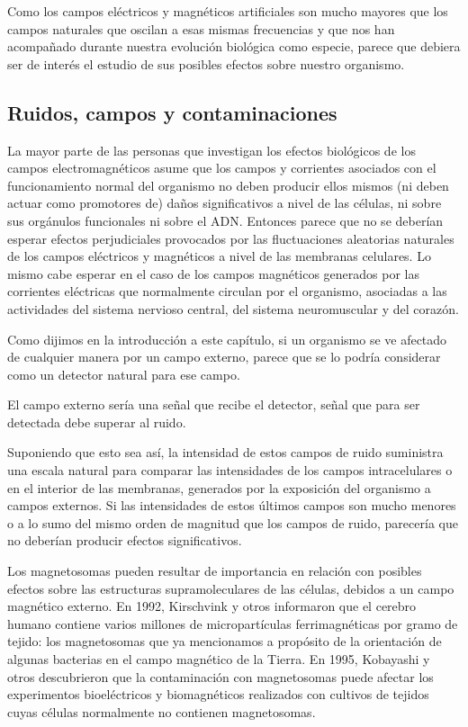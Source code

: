 Como los campos eléctricos y magnéticos artificiales son mucho mayores que los campos naturales que oscilan a esas mismas frecuencias y que nos han acompañado durante nuestra evolución biológica como especie, parece que debiera ser de interés el estudio de sus posibles efectos sobre nuestro organismo.

\subsection{Ruidos, campos y contaminaciones}

La mayor parte de las personas que investigan los efectos biológicos de los campos electromagnéticos asume que los campos y corrientes asociados con el funcionamiento normal del organismo no deben producir ellos mismos (ni deben actuar como promotores de) daños significativos a nivel de las células, ni sobre sus orgánulos funcionales ni sobre el ADN.
Entonces parece que no se deberían esperar efectos perjudiciales provocados por las fluctuaciones aleatorias naturales de los campos eléctricos y magnéticos a nivel de las membranas celulares.
Lo mismo cabe esperar en el caso de los campos magnéticos generados por las corrientes eléctricas que normalmente circulan por el organismo, asociadas a las actividades del sistema nervioso central, del sistema neuromuscular y del corazón.

Como dijimos en la introducción a este capítulo, si un organismo se ve afectado de cualquier manera por un campo externo, parece que se lo podría considerar como un detector natural para ese campo.

El campo externo sería una señal que recibe el detector, señal que para ser detectada debe superar al ruido.

Suponiendo que esto sea así, la intensidad de estos campos de ruido suministra una escala natural para comparar las intensidades de los campos intracelulares o en el interior de las membranas, generados por la exposición del organismo a campos externos.
Si las intensidades de estos últimos campos son mucho menores o a lo sumo del mismo orden de magnitud que los campos de ruido, parecería que no deberían producir efectos significativos.

Los magnetosomas pueden resultar de importancia en relación con posibles efectos sobre las estructuras supramoleculares de las células, debidos a un campo magnético externo.
En 1992, Kirschvink y otros informaron que el cerebro humano contiene varios millones de micropartículas ferrimagnéticas por gramo de tejido: los magnetosomas que ya mencionamos a propósito de la orientación de algunas bacterias en el campo magnético de la Tierra.
En 1995, Kobayashi y otros descubrieron que la contaminación con magnetosomas puede afectar los experimentos bioeléctricos y biomagnéticos realizados con cultivos de tejidos cuyas células normalmente no contienen magnetosomas.

